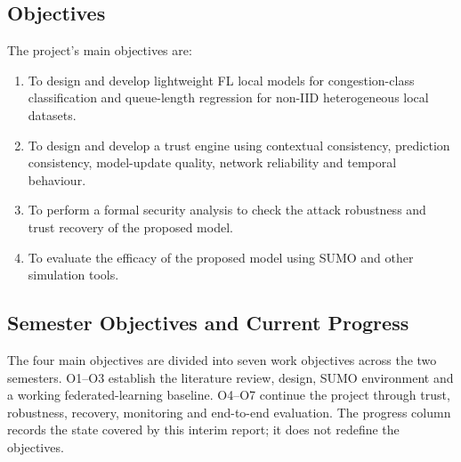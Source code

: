 \subsection{Objectives}
The project's main objectives are:
\begin{enumerate}
  \item To design and develop lightweight FL local models for congestion-class classification and queue-length regression for non-IID heterogeneous local datasets.
  \item To design and develop a trust engine using contextual consistency, prediction consistency, model-update quality, network reliability and temporal behaviour.
  \item To perform a formal security analysis to check the attack robustness and trust recovery of the proposed model.
  \item To evaluate the efficacy of the proposed model using SUMO and other simulation tools.
\end{enumerate}

\subsection{Semester Objectives and Current Progress}
The four main objectives are divided into seven work objectives across the two semesters. O1--O3 establish the literature review, design, SUMO environment and a working federated-learning baseline. O4--O7 continue the project through trust, robustness, recovery, monitoring and end-to-end evaluation. The progress column records the state covered by this interim report; it does not redefine the objectives.

